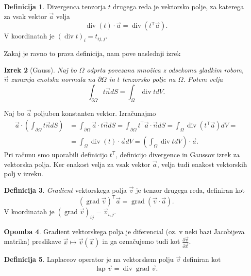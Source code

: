\documentclass[a4paper,twoside]{article}
\theoremstyle{definition} %
\newtheorem{definicija}{Definicija}[section]
\newtheorem{opomba}[definicija]{Opomba}
\theoremstyle{plain} %
\newtheorem{izrek}[definicija]{Izrek}
\numberwithin{equation}{section}
\newcommand{\T}{\mathsf{T}}
\newcommand{\lap}{\operatorname{lap}}
\renewcommand{\div}{\operatorname{div}}
\newcommand{\grad}{\operatorname{grad}}
\newcommand{\dpar}[2]{\ensuremath{\frac{\partial #1}{\partial #2}}}
\newcommand{\vv}{\vec{v}}
\newcommand{\va}{\vec{a}}
\newcommand{\vn}{\vec{n}}
\newcommand{\vx}{\vec{x}}
\begin{document}
\begin{definicija}
  Divergenca tenzorja $t$ drugega reda je vektorsko polje, za katerega za vsak
  vektor $\va$ velja
  \[ \div(t)\cdot \va = \div(t^\T \va). \]
  V koordinatah je $(\div t)_i = t_{ij,j}$.
\end{definicija}

Zakaj je ravno to prava definicija, nam pove naslednji izrek
\begin{izrek}[Gauss]
  \label{izr:gauss}
  Naj bo $\Omega$ odprta povezana množica z odsekoma gladkim robom, $\vn$ zunanja enotska
  normala na $\partial \Omega$ in $t$ tenzorsko polje na $\Omega$.  Potem velja
  \[
    \int_{\partial \Omega} t\vn dS = \int_{\Omega} \div t dV.
  \]
\end{izrek}
\proof
Naj bo $\va$ poljuben konstanten vektor. Izračunajmo
\begin{align*}
  \va \cdot \left( \int_{\partial \Omega} t\vn dS \right) &=
  \int_{\partial \Omega}\va \cdot t\vn dS =
  \int_{\partial \Omega}t^\T \va \cdot \vn dS =
  \int_{\Omega}\div(t^\T \va) dV = \\ &=
  \int_{\Omega}\div(t) \cdot \va dV =
  \left(\int_{\Omega}\div t dV\right) \cdot \va.
\end{align*}
Pri računu smo uporabili definicijo $t^\T$, definicijo divergence in Gaussov
izrek za vektorska polja. Ker enakost velja za vsak vektor $\va$, velja tudi
enakost vektorskih polj v izreku.
\endproof

\begin{definicija}
  \emph{Gradient} vektorskega polja $\vv$ je tenzor drugega reda, definiran kot
  \[
    (\grad\vv)^\T \va = \grad(\vv\cdot\va).
  \]
  V koordinatah je $(\grad\vv)_{ij} = \vv_{i,j}$.
\end{definicija}
\begin{opomba}
  Gradient vektorskega polja je diferencial (oz. v neki bazi Jacobijeva matrika)
  preslikave $\vx \mapsto \vv(\vx)$ in ga označujemo tudi kot $\dpar{\vv}{\vx}$.
\end{opomba}

\begin{definicija}
  Laplaceov operator je na vektorskem polju $\vv$ definiran kot
  \[ \lap \vv = \div\grad \vv.  \]
\end{definicija}
\end{document}

